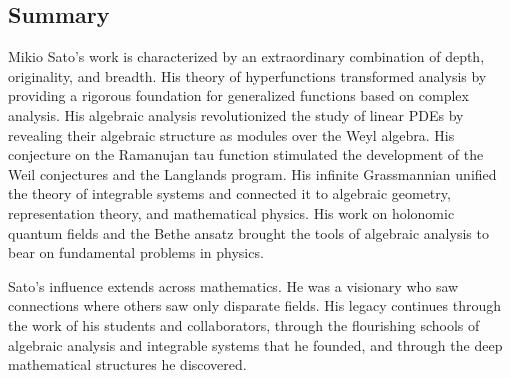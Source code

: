 \subsection{Summary}

Mikio Sato's work is characterized by an extraordinary combination of depth, originality, and breadth. His theory of hyperfunctions transformed analysis by providing a rigorous foundation for generalized functions based on complex analysis. His algebraic analysis revolutionized the study of linear PDEs by revealing their algebraic structure as modules over the Weyl algebra. His conjecture on the Ramanujan tau function stimulated the development of the Weil conjectures and the Langlands program. His infinite Grassmannian unified the theory of integrable systems and connected it to algebraic geometry, representation theory, and mathematical physics. His work on holonomic quantum fields and the Bethe ansatz brought the tools of algebraic analysis to bear on fundamental problems in physics.

Sato's influence extends across mathematics. He was a visionary who saw connections where others saw only disparate fields. His legacy continues through the work of his students and collaborators, through the flourishing schools of algebraic analysis and integrable systems that he founded, and through the deep mathematical structures he discovered.

